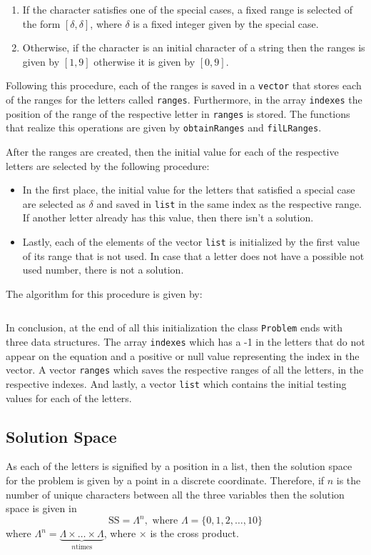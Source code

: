 \documentclass[11pt]{article}
\theoremstyle{definition}
\theoremstyle{remark}
\theoremstyle{remark}
\newcommand{\code}[2]{\inputminted[frame=lines, linenos, firstline=#1,
  lastline=#2]{cpp}{../src/roman-numerals.cpp}}
\begin{document}
\begin{enumerate}
  \item If the character satisfies one of the special cases, a fixed range is
    selected of the form $[\delta, \delta]$, where $\delta$ is a fixed integer
    given by the special case.
  \item Otherwise, if the character is an initial character of a string then the
    ranges is given by $[1, 9]$ otherwise it is given by $[0, 9]$.
\end{enumerate}

Following this procedure, each of the ranges is saved in a \texttt{vector} that
stores each of the ranges for the letters called \texttt{ranges}. Furthermore,
in the array \texttt{indexes} the position of the range of the respective letter
in \texttt{ranges} is stored. The functions that realize this operations are
given by \texttt{obtainRanges} and \texttt{filLRanges}.

After the ranges are created, then the initial value for each of the respective
letters are selected by the following procedure:
\begin{itemize}
  \item In the first place, the initial value for the letters that satisfied a
    special case are selected as $\delta$ and saved in \texttt{list} in the same
    index as the respective range. If another letter already has this value,
    then there isn't a solution.
  \item Lastly, each of the elements of the vector \texttt{list} is initialized
    by the first value of its range that is not used. In case that a letter does
    not have a possible not used number, there is not a solution.
\end{itemize}

The algorithm for this procedure is given by: \code{145}{175}

In conclusion, at the end of all this initialization the class \texttt{Problem}
ends with three data structures. The array \texttt{indexes} which has a -1 in
the letters that do not appear on the equation and a positive or null value
representing the index in the vector. A vector \texttt{ranges} which saves the
respective ranges of all the letters, in the respective indexes. And lastly, a
vector \texttt{list} which contains the initial testing values for each of the
letters.

\subsection{Solution Space}
As each of the letters is signified by a position in a list, then the solution
space for the problem is given by a point in a discrete coordinate. Therefore,
if $n$ is the number of unique characters between all the three variables then
the solution space is given in
%
\begin{equation*}
  \mathrm{SS} = \Lambda^{n}, \text{ where } \Lambda = \{0,1,2,\ldots,10\}
\end{equation*}
%
where $\Lambda^{n} = \underbrace{\Lambda \times \ldots \times \Lambda}_{n \text{
    times}}$, where $\times$ is the cross product.
\end{document}

